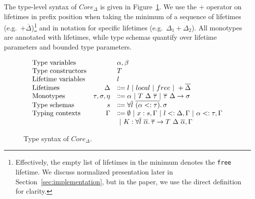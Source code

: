 \documentclass[11pt]{article}
\newcommand{\vor}{~|~}
\newcommand{\ap}{~}
\begin{document}
    The type-level syntax of $Core_\Delta$ is given in Figure\ \ref{fig:core-types}.
    We use the $+$ operator on lifetimes in prefix position when taking the minimum of a sequence of lifetimes (e.g.\ $+\overline{\Delta}$)\footnote{Effectively, the empty list of lifetimes in the minimum denotes the \lstinline[language=colang]{free} lifetime. We discuss normalized presentation later in Section\ \ref{sec:implementation}, but in the paper, we use the direct definition for clarity.} and in notation for specific lifetimes (e.g.\ $\Delta_1 + \Delta_2$).
    All monotypes are annotated with lifetimes, while type schemas quantify over lifetime parameters and bounded type parameters.

    \begin{figure}
        \[
            \begin{array}{lrl}
                \text{Type variables}     &                    & \alpha, \beta                                                                                                      \\
                \text{Type constructors}  &                    & T                                                                                                                  \\
                \text{Lifetime variables} &                    & l                                                                                                                  \\
                \text{Lifetimes}          & \Delta             & \Coloneqq l \vor local \vor free \vor +\overline{\Delta}                                                           \\
                \text{Monotypes}          & \tau, \sigma, \eta & \Coloneqq \alpha \vor T \ap \Delta \ap \overline{\tau} \vor \overline{\tau}~\Delta \to \sigma                      \\
                \text{Type schemas}       & s                  & \Coloneqq \forall \overline{l}~\overline{(\alpha <: \tau)}\ldotp \sigma                                            \\
                \text{Typing contexts}    & \Gamma             & \Coloneqq \emptyset \vor x : s, \Gamma \vor l <: \Delta, \Gamma \vor \alpha <: \tau, \Gamma                        \\
                &                    & \vor K : \forall \overline{l}\ \overline{\alpha}\ldotp \overline{\tau}\to T \ap\Delta\ap \overline{\alpha}, \Gamma
            \end{array}
        \]
        \caption{Type syntax of $Core_\Delta$.}
        \label{fig:core-types}
    \end{figure}
\end{document}
